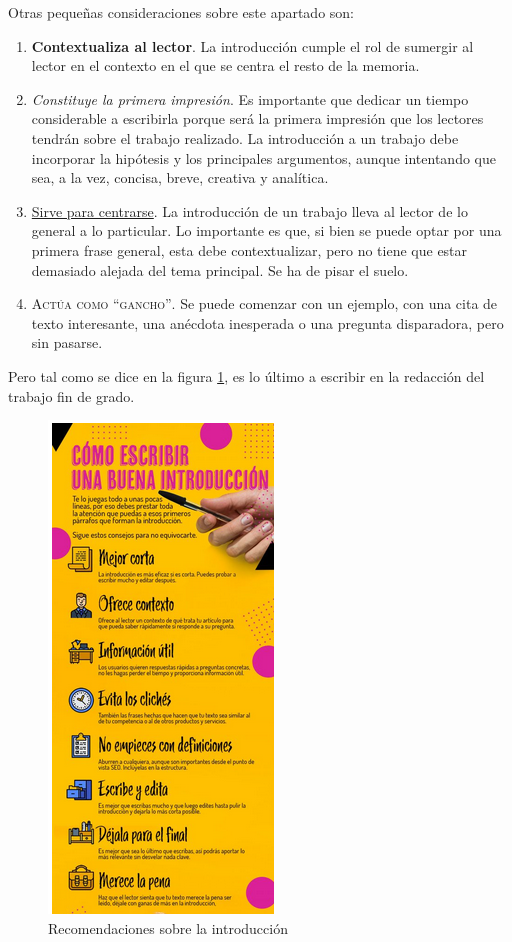 Otras pequeñas consideraciones sobre este apartado son:
\begin{enumerate}
    \item  \textbf{Contextualiza al lector}. La introducción cumple el rol de sumergir al lector en el contexto en el que se  centra el resto de la memoria.
    \item  \textit{Constituye la primera impresión}. Es importante que dedicar un tiempo considerable a escribirla porque será la primera impresión que los lectores tendrán sobre el trabajo realizado. La introducción a un trabajo debe incorporar la hipótesis y los principales argumentos, aunque intentando que sea, a la vez, concisa, breve, creativa y analítica.

\item \underline{ Sirve para centrarse}. La introducción de un trabajo lleva al lector de lo general a lo particular. Lo importante es que, si bien se puede optar por una primera frase general, esta debe contextualizar, pero no tiene que estar demasiado alejada del tema principal. Se ha de pisar el suelo.

\item \textsc{Actúa como “gancho”}.  Se puede comenzar con un ejemplo, con una cita de texto interesante, una anécdota inesperada o una pregunta disparadora, pero sin pasarse.
    
\end{enumerate}


Pero  tal como se dice en la figura \ref{fig:recintro}, es lo último a escribir en la redacción del  trabajo fin de grado.


\begin{figure}
	\begin{center}
		\includegraphics[scale = 0.95]{Figures/intro.png}
	\end{center}
	\caption{\label{fig:recintro} Recomendaciones sobre la introducción}
\end{figure}



